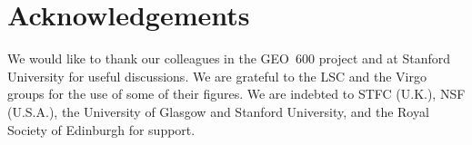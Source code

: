 \documentclass{article}
\begin{document}
\newpage

\section{Acknowledgements}
\label{section:acknowledgements}

We would like to thank our colleagues in the GEO~600 project and at Stanford
University for useful discussions. We are grateful to the LSC and the Virgo
groups for the use of some of their figures. We are indebted to STFC (U.K.), NSF
(U.S.A.), the University of Glasgow and Stanford University, and the Royal Society of Edinburgh for support.




\newpage


\end{document}

